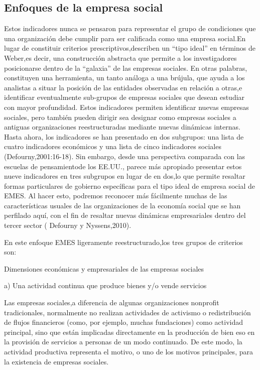 \documentclass{memoir}
\begin{document}
\subsection{Enfoques de la empresa social}
\label{sec:orgb54c10c}

Estos indicadores nunca se pensaron para representar el grupo de  condiciones que una organización debe cumplir para ser   calificada como una   empresa social.En lugar de  constituir criterios prescriptivos,describen un  “tipo ideal” en términos de Weber,es  decir, una construcción abstracta que permite a los  investigadores posicionarse dentro de  la “galaxia” de  las  empresas sociales. En  otras palabras, constituyen una   herramienta, un  tanto análoga a una   brújula, que   ayuda a los  analistas a situar la posición de  las  entidades observadas en  relación a otras,e identificar eventualmente sub-grupos de  empresas sociales que   desean estudiar con   mayor profundidad. Estos indicadores permiten  identificar nuevas empresas sociales, pero también pueden dirigir sea designar como empresas sociales a antiguas organizaciones reestructuradas mediante nuevas dinámicas internas. Hasta ahora, los  indicadores se  han   presentado en  dos   subgrupos: una   lista de  cuatro indicadores  económicos y una   lista   de  cinco indicadores sociales (Defourny,2001:16-18). Sin  embargo, desde una   perspectiva comparada con   las  escuelas de  pensamientode  los  EE.UU., parece más apropiado presentar estos nueve indicadores en  tres   subgrupos en  lugar de  en  dos,lo que   permite resaltar formas particulares de  gobierno específicas para el  tipo   ideal de  empresa social de  EMES. Al  hacer esto, podremos reconocer más fácilmente muchas de  las  características usuales de  las  organizaciones de la economía social que   se  han   perfilado aquí, con   el  fin  de  resaltar nuevas dinámicas empresariales dentro del   tercer sector ( Defourny y Nyssens,2010).

En  este enfoque EMES ligeramente reestructurado,los  tres   grupos de  criterios son:

Dimensiones económicas y empresariales de las empresas sociales


a)  Una actividad continua que   produce bienes y/o  vende servicios

Las   empresas sociales,a diferencia de  algunas organizaciones nonprofit tradicionales, normalmente no  realizan actividades de   activismo o redistribución de  flujos financieros (como, por    ejemplo, muchas fundaciones) como actividad principal, sino que    están implicadas directamente en  la producción de  bien eso en  la provisión de  servicios a personas de  un  modo continuado. De  este modo, la actividad productiva representa el  motivo, o uno   de  los  motivos principales, para la existencia de  empresas   sociales.
\end{document}
